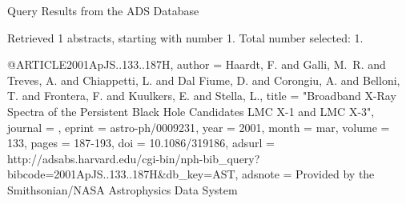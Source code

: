 Query Results from the ADS Database


Retrieved 1 abstracts, starting with number 1.  Total number selected: 1.

@ARTICLE{2001ApJS..133..187H,
   author = {{Haardt}, F. and {Galli}, M.~R. and {Treves}, A. and {Chiappetti}, L. and 
	{Dal Fiume}, D. and {Corongiu}, A. and {Belloni}, T. and {Frontera}, F. and 
	{Kuulkers}, E. and {Stella}, L.},
    title = "{Broadband X-Ray Spectra of the Persistent Black Hole Candidates LMC X-1 and LMC X-3}",
  journal = {\apjs},
   eprint = {astro-ph/0009231},
     year = 2001,
    month = mar,
   volume = 133,
    pages = {187-193},
      doi = {10.1086/319186},
   adsurl = {http://adsabs.harvard.edu/cgi-bin/nph-bib_query?bibcode=2001ApJS..133..187H&db_key=AST},
  adsnote = {Provided by the Smithsonian/NASA Astrophysics Data System}
}


